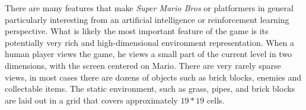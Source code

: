 \documentclass[12pt]{article}
\begin{document}
\begin{multicols*}{2}
There are many features that make \textit {Super Mario Bros} or platformers in general particularly interesting from an artificial intelligence or reinforcement learning perspective. What is likely the most important feature of the game is its potentially very rich and high-dimensional environment representation. When a human player views the game, he views a small part of the current level in two dimensions, with the screen centered on Mario. There are very rarely sparse views, in most cases there are dozens of objects such as brick blocks, enemies and collectable items. The static environment, such as grass, pipes, and brick blocks are laid out in a grid that covers approximately $19 * 19$ cells.

\end{multicols*}
\end{document}
